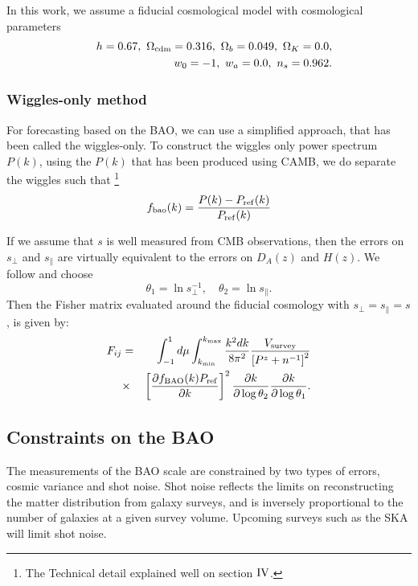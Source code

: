 \documentclass[useAMS,usenatbib]{mn2e}
\begin{document}
In this work, we assume a fiducial cosmological model with  cosmological parameters 
\begin{eqnarray}
&& h=0.67,~\Omega_{{\rm cdm}} = 0.316,~ \Omega_b= 0.049,~\Omega_K= 0.0, \nonumber\\ &&w_0= -1,~w_a = 0.0,~n_s=0.962. \label{cospar}
\end{eqnarray}


\subsubsection{ Wiggles-only method}

For forecasting based on the BAO, we can use a simplified approach, that has been called the wiggles-only. To construct the wiggles only power spectrum $P(k)$, using the $P(k)$ that has been produced using CAMB, we do separate  the wiggles such that \citep{Bull:2014rha}\footnote{The Technical detail explained well on \cite{Bull:2014rha} section ${\rm IV}$.}
\begin{equation}\label{fbao_of_k}
f_{\rm bao}(k) = \frac{P(k) - P_{\rm ref}(k)}{P_{\rm ref}(k)}
\end{equation}

If we assume that $s$ is well measured from CMB observations, then the errors on $s_\perp$ and $s_\|$  are virtually equivalent to the errors on $D_A(z)$ and $H(z)$. 
We follow  \cite{Seo:2007ns} and choose
\begin{equation}
 \theta_1=\ln{s_\perp^{-1}}, \quad \theta_2=\ln{s_\parallel}.
 \end{equation}
 Then  the Fisher matrix  evaluated around the fiducial cosmology with  $s_\perp=s_\parallel=s$, is given by:
\begin{eqnarray}\label{FIJ_re}
F_{ij}&=&\int_{-1}^{1}d\mu\int_{k_{\rm min}}^{k_{\rm max}}\frac{k^2 dk}{8\pi^2} \frac{V_{\rm survey}}{\left[P^z+n^{-1}\right]^2}\nonumber \\
& \times & \left[\frac{\partial  f_{\rm BAO}(k) P_{\rm ref}}{\partial  k} \right ]^2
 \frac{\partial k}{\partial \log \theta_2}\frac{\partial 
 k}{\partial \log \theta_1} .
\end{eqnarray}

\subsection{Constraints on the BAO}
The measurements of the BAO scale are constrained by  two types of errors,  cosmic variance and  shot noise. Shot noise reflects the limits on reconstructing the matter distribution from galaxy surveys,  and  is  inversely proportional to the number of galaxies at a given survey volume. Upcoming surveys such as the SKA will limit shot noise. 
\end{document}
